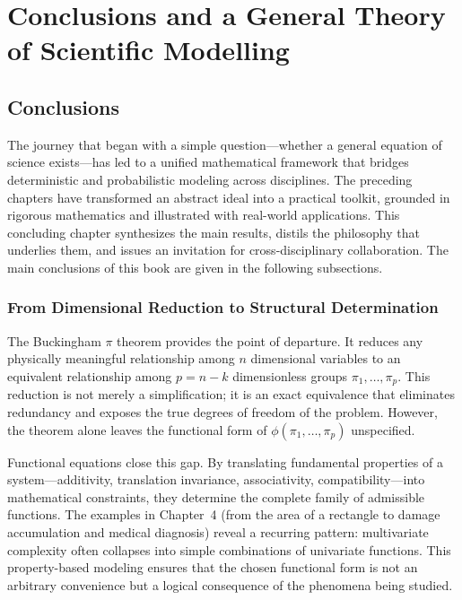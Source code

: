 \chapter{Conclusions and a General Theory of Scientific Modelling}
\label{ch:conclusions}

\section{Conclusions}
The journey that began with a simple question—whether a general equation of science exists—has led to a unified mathematical framework that bridges deterministic and probabilistic modeling across disciplines. The preceding chapters have transformed an abstract ideal into a practical toolkit, grounded in rigorous mathematics and illustrated with real-world applications. This concluding chapter synthesizes the main results, distils the philosophy that underlies them, and issues an invitation for cross-disciplinary collaboration. The main conclusions of this book are given in the following subsections.

\subsection{From Dimensional Reduction to Structural Determination}

The Buckingham \(\pi\) theorem provides the point of departure. It reduces any physically meaningful relationship among \(n\) dimensional variables to an equivalent relationship among \(p = n-k\) dimensionless groups \(\pi_1,\dots,\pi_p\). This reduction is not merely a simplification; it is an exact equivalence that eliminates redundancy and exposes the true degrees of freedom of the problem. However, the theorem alone leaves the functional form of \(\phi(\pi_1,\dots,\pi_p)\) unspecified.

Functional equations close this gap. By translating fundamental properties of a system—additivity, translation invariance, associativity, compatibility—into mathematical constraints, they determine the complete family of admissible functions. The examples in Chapter~4 (from the area of a rectangle to damage accumulation and medical diagnosis) reveal a recurring pattern: multivariate complexity often collapses into simple combinations of univariate functions. This property-based modeling ensures that the chosen functional form is not an arbitrary convenience but a logical consequence of the phenomena being studied.


